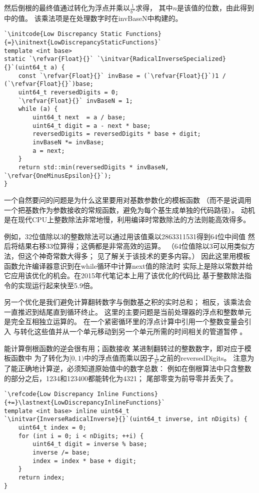 然后倒根的最终值通过转化为浮点并乘以$\displaystyle\frac{1}{b^n}$求得，
其中$n$是该值的位数，由此得到中的值。
该乘法项是在处理数字时在{\ttfamily invBaseN}中构建的。
\begin{lstlisting}
`\initcode{Low Discrepancy Static Functions}{=}\initnext{LowDiscrepancyStaticFunctions}`
template <int base>
static `\refvar{Float}{}` `\initvar{RadicalInverseSpecialized}{}`(uint64_t a) {
    const `\refvar{Float}{}` invBase = (`\refvar{Float}{}`)1 / (`\refvar{Float}{}`)base;
    uint64_t reversedDigits = 0;
    `\refvar{Float}{}` invBaseN = 1;
    while (a) {
        uint64_t next  = a / base;
        uint64_t digit = a - next * base;
        reversedDigits = reversedDigits * base + digit;
        invBaseN *= invBase;
        a = next;
    }
    return std::min(reversedDigits * invBaseN, `\refvar{OneMinusEpsilon}{}`);
}
\end{lstlisting}

一个自然要问的问题是为什么这里要用对基数参数化的模板函数
（而不是说调用一个把基数作为参数接收的常规函数，避免为每个基生成单独的代码路径）。
动机是在现代CPU上整数除法非常地慢，利用编译时常数除法的方法则能高效得多。

例如，32位值除以3的整数除法可以通过用该值乘以2863311531得到64位中间值
然后将结果右移33位算得；这俩都是非常高效的运算。
（64位值除以3可以用类似方法，但这个神奇常数大得多；
见\citet{10.5555/2462741}了解关于该技术的更多内容。）
因此这里用模板函数允许编译器意识到在{\ttfamily while}循环中计算{\ttfamily next}值的除法时
实际上是除以常数并给它应用该优化的机会。在2015年代笔记本上用了该优化的代码比
基于整数除法指令的实现运行起来快至5.9倍。

另一个优化是我们避免计算翻转数字与倒数基之积的实时总和；
相反，该乘法会一直推迟到结尾直到循环终止。
这里的主要问题是当前处理器的浮点和整数单元是完全互相独立运算的。
在一个紧密循环里的浮点计算中引用一个整数变量会引入
与转化这些值并从一个单元移动到另一个单元所需的时间相关的管道暂停
。

能计算倒根函数的逆会很有用；函数接收
某进制翻转过的整数数字，即对应于模板函数中
为了转化为$[0,1)$中的浮点值而乘以因子$\displaystyle\frac{1}{b^n}$之前的{\ttfamily reversedDigits}。
注意为了能正确地计算逆，必须知道原始值中的数字总数：
例如在倒根算法中只含整数的部分之后，1234和123400都能转化为4321；
尾部零变为前导零并丢失了。
\begin{lstlisting}
`\refcode{Low Discrepancy Inline Functions}{+=}\lastnext{LowDiscrepancyInlineFunctions}`
template <int base> inline uint64_t
`\initvar{InverseRadicalInverse}{}`(uint64_t inverse, int nDigits) {
    uint64_t index = 0;
    for (int i = 0; i < nDigits; ++i) {
        uint64_t digit = inverse % base;
        inverse /= base;
        index = index * base + digit;
    }
    return index;
}
\end{lstlisting}

